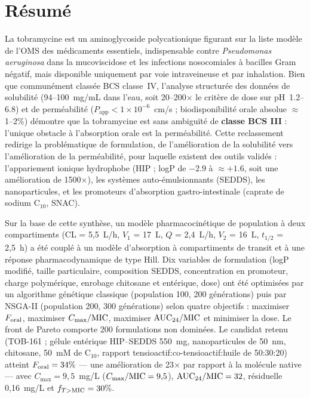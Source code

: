 \chapter*{Résumé}

La tobramycine est un aminoglycoside polycationique figurant sur la liste modèle de l'OMS des médicaments essentiels, indispensable contre \textit{Pseudomonas aeruginosa} dans la mucoviscidose et les infections nosocomiales à bacilles Gram négatif, mais disponible uniquement par voie intraveineuse et par inhalation. Bien que communément classée BCS classe~IV, l'analyse structurée des données de solubilité (94--100~mg/mL dans l'eau, soit 20--200$\times$ le critère de dose sur pH~1.2--6.8) et de perméabilité ($P_{\mathrm{app}}<1\times10^{-6}$~cm/s ; biodisponibilité orale absolue $\approx$1--2\%) démontre que la tobramycine est sans ambiguïté de \textbf{classe BCS III} : l'unique obstacle à l'absorption orale est la perméabilité. Cette reclassement redirige la problématique de formulation, de l'amélioration de la solubilité vers l'amélioration de la perméabilité, pour laquelle existent des outils validés : l'appariement ionique hydrophobe (HIP ; logP de $-2.9$ à $\approx+1.6$, soit une amélioration de 1500$\times$), les systèmes auto-émulsionnants (SEDDS), les nanoparticules, et les promoteurs d'absorption gastro-intestinale (caprate de sodium C$_{10}$, SNAC).

Sur la base de cette synthèse, un modèle pharmacocinétique de population à deux compartiments (CL = 5,5~L/h, $V_1$ = 17~L, $Q$ = 2,4~L/h, $V_2$ = 16~L, $t_{1/2}$ = 2,5~h) a été couplé à un modèle d'absorption à compartiments de transit et à une réponse pharmacodynamique de type Hill. Dix variables de formulation (logP modifié, taille particulaire, composition SEDDS, concentration en promoteur, charge polymérique, enrobage chitosane et entérique, dose) ont été optimisées par un algorithme génétique classique (population 100, 200 générations) puis par NSGA-II (population 200, 300 générations) selon quatre objectifs : maximiser $F_{\mathrm{oral}}$, maximiser $C_{\max}/\mathrm{MIC}$, maximiser $\mathrm{AUC}_{24}/\mathrm{MIC}$ et minimiser la dose. Le front de Pareto comporte 200 formulations non dominées. Le candidat retenu (TOB-161 ; gélule entérique HIP--SEDDS 550~mg, nanoparticules de 50~nm, chitosane, 50~mM de C$_{10}$, rapport tensioactif:co-tensioactif:huile de 50:30:20) atteint $F_{\mathrm{oral}} = 34\%$ --- une amélioration de 23$\times$ par rapport à la molécule native --- avec $C_{\max} = 9{,}5$~mg/L ($C_{\max}/\mathrm{MIC} = 9{,}5$), $\mathrm{AUC}_{24}/\mathrm{MIC} = 32$, résiduelle 0,16~mg/L et $f_{T>\mathrm{MIC}} = 30\%$.

